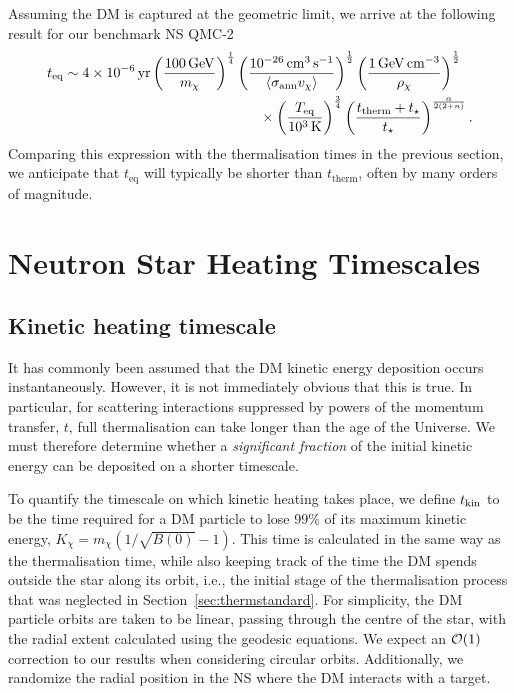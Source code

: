 Assuming the DM is captured at the geometric limit, we arrive at the following result for our benchmark NS QMC-2
\begin{equation}
  \begin{split}
    t_{\rm eq}  &\sim  4\times10^{-6}\yr\left(\frac{100\GeV}{m_\chi}\right)^{\frac{1}{4}}\left(\frac{10^{-26}\cm^3 \s^{-1}}{\langle\sigma_\text{ann} v_\chi\rangle}\right)^{\frac{1}{2}} \left(\frac{1\GeV\cm^{-3}}{\rho_\chi}\right)^{\frac{1}{2}}
     \\&\hspace*{14em} \times \left(\frac{T_{\rm eq}}{10^3\K}\right)^{\frac{3}{4}} 
    \left(\frac{t_{\rm therm}+\tstar}{\tstar}\right)^{\frac{\alpha}{2(2+n)}}.
  \end{split}
\end{equation}
Comparing this expression with the thermalisation times in the previous section, we anticipate that  $t_\text{eq}$ will typically be shorter than $t_\text{therm}$, often by many orders of magnitude.




\section{Neutron Star Heating Timescales}
\label{ch6:sec:results}



\subsection{Kinetic heating timescale}
\label{ch6:subsec:KinHeating}


It has commonly been assumed that the DM kinetic energy deposition occurs instantaneously. However, it is not immediately obvious that this is true. In particular, for scattering interactions suppressed by powers of the momentum transfer, $t$, full thermalisation can take longer than the age of the Universe. We must therefore determine whether a {\it significant fraction} of the initial kinetic energy can be deposited on a shorter timescale.



To quantify the timescale on which kinetic heating takes place, we define $t_{\rm kin}$ to be the time required for a DM particle to lose 99\% of its maximum kinetic energy, $K_\chi = m_\chi (1/\sqrt{B(0)} - 1)$.  
This time is calculated in the same way as the thermalisation time, while also keeping track of the time the DM spends outside the star along its orbit, i.e., the initial stage of the thermalisation process that was neglected in Section~\ref{sec:thermstandard}. For simplicity, the DM particle orbits are taken to be linear, passing through the centre of the star, with the radial extent calculated using the geodesic equations. We expect an ${\cal O}(1)$ correction to our results when considering circular orbits.
Additionally, we randomize the radial position in the NS where the DM interacts with a target. 

